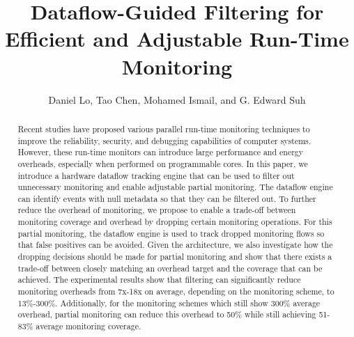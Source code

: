 \title{
Dataflow-Guided Filtering for Efficient and Adjustable Run-Time Monitoring
}

{\author{Daniel Lo, Tao Chen, Mohamed Ismail, and G. Edward Suh}}

\date{}
\maketitle

\thispagestyle{empty}

\begin{abstract}

Recent studies have proposed various parallel run-time monitoring techniques to
improve the reliability, security, and debugging capabilities of computer
systems. However, these run-time monitors can introduce large performance and energy
overheads, especially when performed on programmable cores.
In this paper, we introduce a hardware dataflow tracking engine that can be
used to filter out unnecessary monitoring and enable adjustable partial monitoring.
The dataflow engine can identify events with null metadata so that they can
be filtered out. To further reduce the overhead of monitoring, we propose
to enable a trade-off between monitoring coverage and overhead by dropping certain
monitoring operations. For this partial monitoring, the dataflow engine is used
to track dropped monitoring flows so that false positives can be avoided.
Given the architecture, we also investigate how the dropping decisions should be
made for partial monitoring and show that there exists a trade-off between closely
matching an overhead target and the coverage that can be achieved.
The experimental results show that filtering can significantly reduce monitoring
overheads from 7x-18x on average, depending on the monitoring scheme, to
13\%-300\%. Additionally, for the monitoring schemes which still show 300\%
average overhead, partial monitoring can reduce this overhead to 50\% while
still achieving 51-83\% average monitoring coverage. 

\end{abstract}
